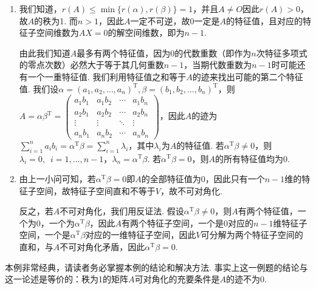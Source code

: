 \begin{solution}
    \begin{enumerate}
        \item 我们知道，$r(A)\leqslant\min{\{r(\alpha),r(\beta)\}}=1$，并且$A\neq O$因此$r(A)>0$，故$A$的秩为1. 而$n>1$，因此$A$一定不可逆，故0一定是$A$的特征值，且对应的特征子空间维数为$AX=0$的解空间维数，即为$n-1$.

              由此我们知道$A$最多有两个特征值，因为0的代数重数（即作为$n$次特征多项式的零点次数）必然大于等于其几何重数$n-1$，当期代数重数为$n-1$时可能还有一个一重特征值. 我们利用特征值之和等于$A$的迹来找出可能的第二个特征值. 我们设$\alpha=(a_1,a_2,\ldots,a_n)^\mathrm{T},\beta=(b_1,b_2,\ldots,b_n)^\mathrm{T}$，则$A=\alpha\beta^\mathrm{T}=\begin{pmatrix}
                      a_1b_1 & a_1b_2 & \cdots & a_1b_n \\
                      a_2b_1 & a_2b_2 & \cdots & a_2b_n \\
                      \vdots & \vdots & \ddots & \vdots \\
                      a_nb_1 & a_nb_2 & \cdots & a_nb_n
                  \end{pmatrix}$，因此$A$的迹为$\sum\limits_{i=1}^na_ib_i=\alpha^\mathrm{T}\beta=\sum\limits_{i=1}^n\lambda_i$，其中$\lambda_i$为$A$的特征值. 若$\alpha^\mathrm{T}\beta\neq 0$，则$\lambda_i=0,\enspace i=1,\ldots,n-1$，$\lambda_n=\alpha^\mathrm{T}\beta$. 若$\alpha^\mathrm{T}\beta=0$，则$A$的所有特征值均为0.

        \item 由上一小问可知，若$\alpha^\mathrm{T}\beta=0$即$A$的全部特征值为0，因此只有一个$n-1$维的特征子空间，故特征子空间直和不等于$V$，故不可对角化.

              反之，若$A$不可对角化，我们用反证法. 假设$\alpha^\mathrm{T}\beta\neq 0$，则$A$有两个特征值，一个为0，一个为$\alpha^\mathrm{T}\beta$，因此$A$有两个特征子空间，一个是0对应的$n-1$维特征子空间，一个是$\alpha^\mathrm{T}\beta$对应的一维特征子空间，因此$V$可分解为两个特征子空间的直和，与$A$不可对角化矛盾，因此$\alpha^\mathrm{T}\beta=0$.
    \end{enumerate}
\end{solution}

本例非常经典，请读者务必掌握本例的结论和解决方法. 事实上这一例题的结论与这一论述是等价的：秩为1的矩阵$A$可对角化的充要条件是$A$的迹不为0.

